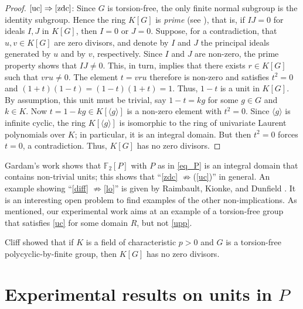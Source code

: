 \documentclass[11pt]{amsart}
\theoremstyle{mythm}
\theoremstyle{mydef}
\theoremstyle{myrem}
\numberwithin{equation}{section}
\begin{document}
\begin{proof}
   
   

   \noindent$\eqref{uc}\Rightarrow \eqref{zdc}$: Since $G$ is torsion-free, the only finite normal subgroup is the identity subgroup. Hence the ring $K[G]$ is \emph{prime} (see \cite[Theorem 4.2.10]{passman}), that is, if $IJ=0$ for  ideals $I,J $ in $K[G]$, then $I=0$ or $J=0$. Suppose, for a contradiction, that $u,v\in K[G]$ are zero divisors, and denote by $I$ and $J$ the principal ideals generated by $u$ and by $v$, respectively. Since $I$ and $J$ are non-zero, the prime property shows that $IJ\ne 0$. This, in turn, implies that there exists $r\in K[G]$ such that  $vru\ne 0$.  The element $t=vru$ therefore is non-zero and satisfies $t^2=0$ and $(1+t)(1-t)=(1-t)(1+t)=1$. Thus, $1-t$ is a unit in $K[G]$. By assumption, this unit must be trivial, say $1-t=kg$ for some $g\in G$ and $k\in K$. Now  $t=1-kg\in K[\langle g\rangle]$ is a non-zero element with $t^2=0$. Since $\langle g\rangle$ is infinite cyclic, the ring $K[\langle g\rangle]$ is isomorphic to the ring of univariate Laurent polynomials over $K$; in particular, it is an integral domain. But then $t^2=0$ forces $t=0$, a contradiction. Thus, $K[G]$ has no zero divisors.
\end{proof}

  Gardam's work \cite{G} shows that $\mathbb{F}_2[P]$ with $P$ as in \eqref{eq_P} is an integral domain that contains non-trivial units; this shows that ``\eqref{zdc} $\not\Rightarrow$(\ref{uc})'' in general. An example showing ``\eqref{diff} $\not\Rightarrow$\eqref{lo}'' is given by Raimbault, Kionke, and  Dunfield \cite{RKD}. It is an interesting open problem to find examples of the other non-implications. As mentioned, our experimental work aims at  an example of a torsion-free group that satisfies \eqref{uc} for some domain  $R$, but not \eqref{upp}.


Cliff \cite[Theorem 2]{cliff} showed that if $K$ is a field of characteristic $p>0$ and $G$ is a torsion-free polycyclic-by-finite group, then $K[G]$ has no zero divisors. 
 




\section{Experimental results on units in $P$}
\end{document}
